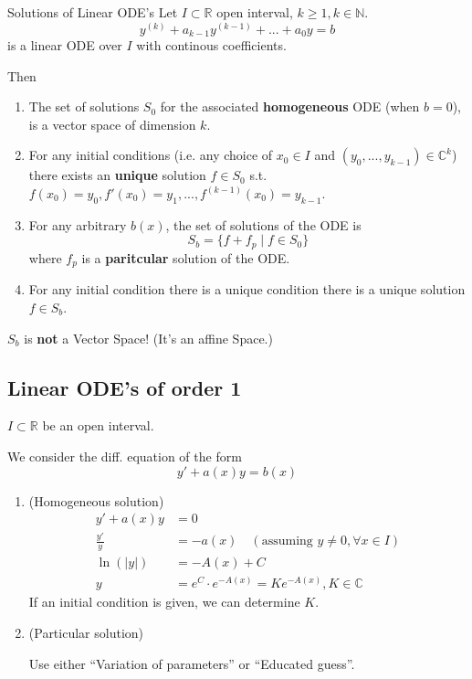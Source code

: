 \documentclass[a4paper,fontsize = 10pt]{article}
\def\R{\mathbb{R}}
\def\C{\mathbb{C}}
\def\N{\mathbb{N}}
\begin{document}
\begin{mainbox}{Solutions of Linear ODE's}
    Let $I \subset \R$ open interval, $k \geq 1, k \in \N$.
    $$y^{(k)}+a_{k-1}y^{(k-1)} + ... + a_0y = b$$
    is a linear ODE over $I$ with continous coefficients.
    
    Then
    \begin{enumerate}
        \item The set of solutions $S_0$ for the associated \textbf{homogeneous} ODE (when $b = 0$), is a vector space of dimension $k$.
        \item For any initial conditions (i.e. any choice of $x_0 \in I$ and $(y_0, ..., y_{k-1}) \in \C^k$) there exists an \textbf{unique} solution $f \in S_0$ s.t. $f(x_0) = y_0, f'(x_0) = y_1, ..., f^{(k-1)}(x_0) = y_{k-1}$.
        \item For any arbitrary $b(x)$, the set of solutions of the ODE is $$S_b = \{f + f_p \mid f \in S_0\}$$ where $f_p$ is a \textbf{paritcular} solution of the ODE.
        \item For any initial condition there is a unique condition there is a unique solution $f \in S_b$.
    \end{enumerate}
     $S_b$ is \textbf{not} a Vector Space! (It's an affine Space.)
\end{mainbox}

\subsection{Linear ODE's of order 1}
$I \subset \R$ be an open interval.

We consider the diff. equation of the form \[y' + a(x)y = b(x)\]
\begin{enumerate}
  \item (Homogeneous solution) 
  \begin{align*}
    y' + a(x)y &= 0\\
    \frac{y'}{y} &= -a(x) \quad (\text{assuming } y \neq 0, \forall x \in I)\\
    \ln(|y|) &= -A(x)+C\\
    y &= e^C \cdot e^{-A(x)} = Ke^{-A(x)}, K \in \C
  \end{align*}
  If an initial condition is given, we can determine $K$.
  \item (Particular solution) 
  
  Use either ``Variation of parameters'' or ``Educated guess''.
\end{enumerate}
\end{document}
